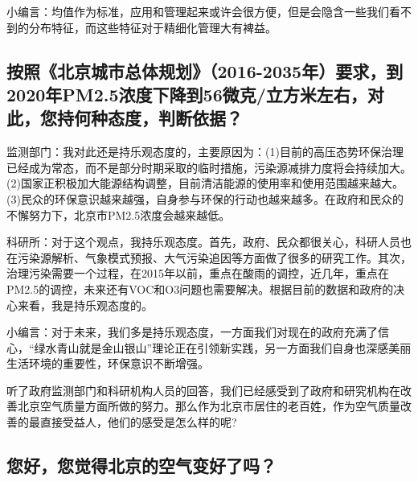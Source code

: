 \documentclass[]{book}
\begin{document}
小编言：均值作为标准，应用和管理起来或许会很方便，但是会隐含一些我们看不到的分布特征，而这些特征对于精细化管理大有裨益。

\hypertarget{ux6309ux7167ux5317ux4eacux57ceux5e02ux603bux4f53ux89c4ux52122016-2035ux5e74ux8981ux6c42ux52302020ux5e74pm2.5ux6d53ux5ea6ux4e0bux964dux523056ux5faeux514bux7acbux65b9ux7c73ux5de6ux53f3ux5bf9ux6b64ux60a8ux6301ux4f55ux79cdux6001ux5ea6ux5224ux65adux4f9dux636e}{%
\subsection{按照《北京城市总体规划》（2016-2035年）要求，到2020年PM2.5浓度下降到56微克/立方米左右，对此，您持何种态度，判断依据？}\label{ux6309ux7167ux5317ux4eacux57ceux5e02ux603bux4f53ux89c4ux52122016-2035ux5e74ux8981ux6c42ux52302020ux5e74pm2.5ux6d53ux5ea6ux4e0bux964dux523056ux5faeux514bux7acbux65b9ux7c73ux5de6ux53f3ux5bf9ux6b64ux60a8ux6301ux4f55ux79cdux6001ux5ea6ux5224ux65adux4f9dux636e}}

监测部门：我对此还是持乐观态度的，主要原因为：(1)目前的高压态势环保治理已经成为常态，而不是部分时期采取的临时措施，污染源减排力度将会持续加大。(2)国家正积极加大能源结构调整，目前清洁能源的使用率和使用范围越来越大。(3)民众的环保意识越来越强，自身参与环保的行动也越来越多。在政府和民众的不懈努力下，北京市PM2.5浓度会越来越低。

科研所：对于这个观点，我持乐观态度。首先，政府、民众都很关心，科研人员也在污染源解析、气象模式预报、大气污染追因等方面做了很多的研究工作。其次，治理污染需要一个过程，在2015年以前，重点在酸雨的调控，近几年，重点在PM2.5的调控，未来还有VOC和O3问题也需要解决。根据目前的数据和政府的决心来看，我是持乐观态度的。

小编言：对于未来，我们多是持乐观态度，一方面我们对现在的政府充满了信心，``绿水青山就是金山银山''理论正在引领新实践，另一方面我们自身也深感美丽生活环境的重要性，环保意识不断增强。

听了政府监测部门和科研机构人员的回答，我们已经感受到了政府和研究机构在改善北京空气质量方面所做的努力。那么作为北京市居住的老百姓，作为空气质量改善的最直接受益人，他们的感受是怎么样的呢?

\hypertarget{ux60a8ux597dux60a8ux89c9ux5f97ux5317ux4eacux7684ux7a7aux6c14ux53d8ux597dux4e86ux5417}{%
\subsection{您好，您觉得北京的空气变好了吗？}\label{ux60a8ux597dux60a8ux89c9ux5f97ux5317ux4eacux7684ux7a7aux6c14ux53d8ux597dux4e86ux5417}}
\end{document}
